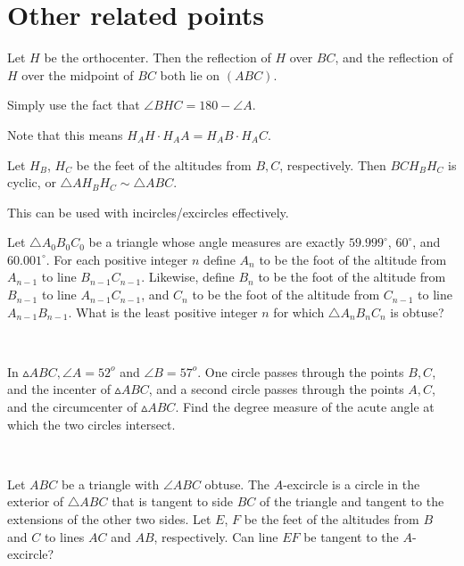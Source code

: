 \documentclass{article}
\begin{document}
\section{Other related points}
\begin{theo}
Let $H$ be the orthocenter. Then the reflection of $H$ over $BC$, and the reflection of $H$ over the midpoint of $BC$ both lie on $(ABC)$.
\end{theo}
\begin{pro}
Simply use the fact that $\angle BHC = 180 - \angle A$.
\end{pro}
Note that this means $H_AH\cdot H_AA = H_AB\cdot H_AC$.
\begin{theo}
Let $H_B$, $H_C$ be the feet of the altitudes from $B, C$, respectively. Then $BCH_BH_C$ is cyclic, or $\triangle AH_BH_C \sim \triangle ABC$.\\
\end{theo}
This can be used with incircles/excircles effectively.\\
\problems
{}
\begin{prob}[AMC 12A 2019/25]{3}
Let $\triangle A_0B_0C_0$ be a triangle whose angle measures are exactly $59.999^\circ$, $60^\circ$, and $60.001^\circ$. For each positive integer $n$ define $A_n$ to be the foot of the altitude from $A_{n-1}$ to line $B_{n-1}C_{n-1}$. Likewise, define $B_n$ to be the foot of the altitude from $B_{n-1}$ to line $A_{n-1}C_{n-1}$, and $C_n$ to be the foot of the altitude from $C_{n-1}$ to line $A_{n-1}B_{n-1}$. What is the least positive integer $n$ for which $\triangle A_nB_nC_n$ is obtuse?
\end{prob}\\
\begin{prob}{3}
In $\vartriangle ABC, \angle A = 52^o$ and $\angle B = 57^o$. One circle passes through the points $B, C$, and the incenter of $\vartriangle ABC$, and a second circle passes through the points $A, C$, and the circumcenter of $\vartriangle ABC$. Find the degree measure of the acute angle at which the two circles intersect.
\end{prob}\\
\begin{prob}[JMO 2019/4]{4}
Let $ABC$ be a triangle with $\angle ABC$ obtuse. The $A$-excircle is a circle in the exterior of $\triangle ABC$ that is tangent to side $BC$ of the triangle and tangent to the extensions of the other two sides. Let $E$, $F$ be the feet of the altitudes from $B$ and $C$ to lines $AC$ and $AB$, respectively. Can line $EF$ be tangent to the $A$-excircle?
\end{prob}\\
\end{document}
